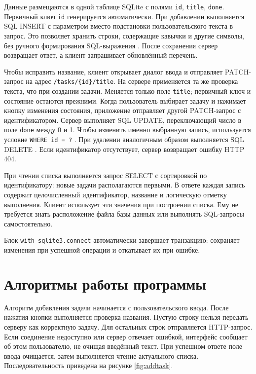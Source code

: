 Данные размещаются в одной таблице SQLite с полями \texttt{id}, \texttt{title}, \texttt{done}. Первичный ключ \texttt{id} генерируется автоматически. При добавлении выполняется SQL INSERT с параметром вместо подстановки пользовательского текста в запрос. Это позволяет хранить строки, содержащие кавычки и другие символы, без ручного формирования SQL-выражения \cite{pythonsqlite}. После сохранения сервер возвращает ответ, а клиент запрашивает обновлённый перечень.

Чтобы исправить название, клиент открывает диалог ввода и отправляет PATCH-запрос на адрес \texttt{/tasks/\{id\}/title}. На сервере применяется та же проверка текста, что при создании задачи. Меняется только поле \texttt{title}; первичный ключ и состояние остаются прежними. Когда пользователь выбирает задачу и нажимает кнопку изменения состояния, приложение отправляет другой PATCH-запрос с идентификатором. Сервер выполняет SQL UPDATE, переключающий число в поле \texttt{done} между 0 и 1. Чтобы изменить именно выбранную запись, используется условие \texttt{WHERE id = ?} \cite{pythonsqlite}. При удалении аналогичным образом выполняется SQL DELETE \cite{pythonsqlite}. Если идентификатор отсутствует, сервер возвращает ошибку HTTP 404.

При чтении списка выполняется запрос SELECT с сортировкой по идентификатору: новые задачи располагаются первыми. В ответе каждая запись содержит целочисленный идентификатор, название и логическую отметку выполнения. Клиент использует эти значения при построении списка. Ему не требуется знать расположение файла базы данных или выполнять SQL-запросы самостоятельно.

Блок \texttt{with sqlite3.connect} автоматически завершает транзакцию: сохраняет изменения при успешной операции и откатывает их при ошибке.

\section{Алгоритмы работы программы}

Алгоритм добавления задачи начинается с пользовательского ввода. После нажатия кнопки выполняется проверка названия. Пустую строку нельзя передать серверу как корректную задачу. Для остальных строк отправляется HTTP-запрос. Если соединение недоступно или сервер отвечает ошибкой, интерфейс сообщает об этом пользователю, не очищая введённый текст. При успешном ответе поле ввода очищается, затем выполняется чтение актуального списка. Последовательность приведена на рисунке \ref{fig:addtask}.

